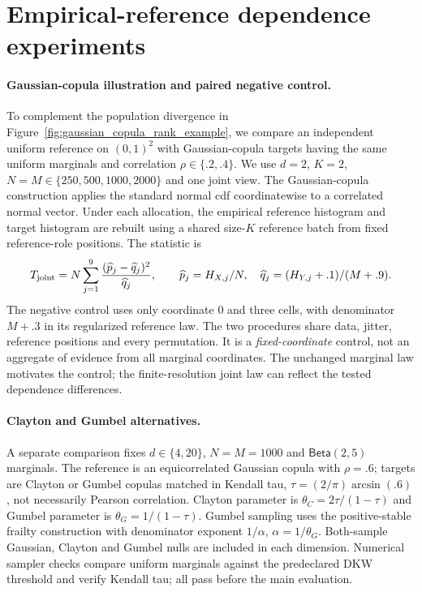 \section{Empirical-reference dependence experiments}\label{app:dependence-power}
\paragraph{Gaussian-copula illustration and paired negative control.}
To complement the population divergence in
Figure~\ref{fig:gaussian_copula_rank_example}, we compare an independent uniform
reference on $(0,1)^2$ with Gaussian-copula targets having the same uniform
marginals and correlation $\rho\in\{.2,.4\}$. We use $d=2$, $K=2$,
$N=M\in\{250,500,1000,2000\}$ and one joint view. The Gaussian-copula
construction applies the standard normal cdf coordinatewise to a correlated
normal vector. Under each allocation, the empirical reference histogram and
target histogram are rebuilt using a shared size-$K$ reference batch from fixed
reference-role positions. The statistic is
\[
 T_{\rm joint}=N\sum_{j=1}^{9}
 \frac{(\widehat p_j-\widehat q_j)^2}{\widehat q_j},\qquad
 \widehat p_j=H_{X,j}/N,\quad
 \widehat q_j=(H_{Y,j}+.1)/(M+.9).
\]
The negative control uses only coordinate 0 and three cells, with denominator
$M+.3$ in its regularized reference law. The two procedures share data, jitter,
reference positions and every permutation. It is a \emph{fixed-coordinate}
control, not an aggregate of evidence from all marginal coordinates.
The unchanged marginal law motivates the control; the finite-resolution
joint law can reflect the tested dependence differences.

\paragraph{Clayton and Gumbel alternatives.}
A separate comparison fixes $d\in\{4,20\}$, $N=M=1000$ and
$\mathsf{Beta}(2,5)$ marginals. The reference is an equicorrelated Gaussian
copula with $\rho=.6$; targets are Clayton or Gumbel copulas matched in
Kendall tau, $\tau=(2/\pi)\arcsin(.6)$, not necessarily Pearson correlation.
Clayton parameter is $\theta_C=2\tau/(1-\tau)$ and Gumbel parameter is
$\theta_G=1/(1-\tau)$. Gumbel sampling uses the positive-stable frailty
construction with denominator exponent $1/\alpha$, $\alpha=1/\theta_G$.
Both-sample Gaussian, Clayton and Gumbel nulls are included in each dimension.
Numerical sampler checks compare uniform marginals against the predeclared
DKW threshold and verify Kendall tau; all pass before the main evaluation.

